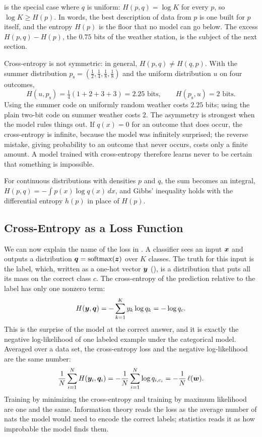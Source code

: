  is the special case where $q$ is uniform:
$H(p, q) = \log K$ for every $p$, so $\log K \ge H(p)$. In words, the
best description of data from $p$ is one built for $p$ itself, and the
entropy $H(p)$ is the floor that no model can go below. The excess
$H(p, q) - H(p)$, the $0.75$ bits of the weather station, is the
subject of the next section.

Cross-entropy is not symmetric: in general, $H(p, q) \ne H(q, p)$. With
the summer distribution $p_{\text{s}} = (\tfrac12, \tfrac14, \tfrac18,
\tfrac18)$ and the uniform distribution $u$ on four outcomes,
\[
  H(u, p_{\text{s}}) = \tfrac14 (1 + 2 + 3 + 3) = 2.25 \text{ bits},
  \qquad
  H(p_{\text{s}}, u) = 2 \text{ bits}.
\]
Using the summer code on uniformly random weather costs $2.25$ bits;
using the plain two-bit code on summer weather costs $2$. The asymmetry
is strongest when the model rules things out. If $q(x) = 0$ for an
outcome that does occur, the cross-entropy is infinite, because the
model was infinitely surprised; the reverse mistake, giving probability
to an outcome that never occurs, costs only a finite amount. A model
trained with cross-entropy therefore learns never to be certain that
something is impossible.

For continuous distributions with densities $p$ and $q$, the sum becomes
an integral, $H(p, q) = -\int p(x) \log q(x)\, dx$, and Gibbs' inequality
holds with the differential entropy $h(p)$ in place of $H(p)$.

\subsection{Cross-Entropy as a Loss Function}
\label{sec:ch07-ce-loss}

We can now explain the name of the loss in . A
classifier sees an input $\bm{x}$ and outputs a distribution $\bm{q} =
\operatorname{softmax}(\bm{z})$ over $K$ classes. The truth for this
input is the label, which, written as a one-hot vector $\bm{y}$
(), is a distribution that puts all its mass
on the correct class $c$. The cross-entropy of the prediction relative
to the label has only one nonzero term:
\[
  H(\bm{y}, \bm{q}) = -\sum_{k=1}^{K} y_k \log q_k = -\log q_c .
\]
This is the surprise of the model at the correct answer, and it is
exactly the negative log-likelihood of one labeled example under the
categorical model. Averaged over a data set, the cross-entropy loss and
the negative log-likelihood are the same number:
\[
  \frac{1}{N} \sum_{i=1}^{N} H(\bm{y}_i, \bm{q}_i)
  = -\frac{1}{N} \sum_{i=1}^{N} \log q_{i, c_i}
  = -\frac{1}{N}\, \ell(\bm{w}) .
\]
Training by minimizing the cross-entropy and training by maximum
likelihood are one and the same. Information theory reads the loss as
the average number of nats the model would need to encode the correct
labels; statistics reads it as how improbable the model finds them.

